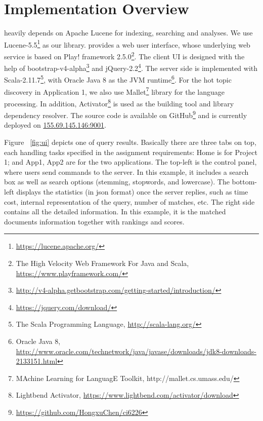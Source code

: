 \section{Implementation Overview}\label{sec:impl-overview}

{\SS} heavily depends on Apache Lucene for indexing, searching and analyses. We use Lucene-5.5\footnote{\url{https://lucene.apache.org/}} as our library. {\SS} provides a web user interface, whose underlying web service is based on Play! framework 2.5.0\footnote{The High Velocity Web Framework For Java and Scala, \url{https://www.playframework.com/}}. The client UI is designed with the help of bootstrap-v4-alpha\footnote{\url{http://v4-alpha.getbootstrap.com/getting-started/introduction/}} and jQuery-2.2\footnote{\url{https://jquery.com/download/}}. The server side is implemented with Scala-2.11.7\footnote{The Scala Programming Language, \url{http://scala-lang.org/}}, with Oracle Java 8 as the JVM runtime\footnote{Oracle Java 8, \url{http://www.oracle.com/technetwork/java/javase/downloads/jdk8-downloads-2133151.html}}.
For the hot topic discovery in Application 1, we also use Mallet\footnote{MAchine Learning for LanguagE Toolkit, http://mallet.cs.umass.edu/} library for the language processing. In addition, \textsf{Activator}\footnote{Lightbend Activator, \url{https://www.lightbend.com/activator/download}} is used as the building tool and library dependency resolver. The source code is available on GitHub\footnote{\url{https://github.com/HongxuChen/ci6226}} and {\SS} is currently deployed on \url{155.69.145.146:9001}.

Figure ~\ref{fig:ui} depicts one of {\SS} query results. Basically there are three tabs on top, each handling tasks specified in the assignment requirements: \textsf{Home} is for Project 1; and \textsf{App1}, \textsf{App2} are for the two applications. The top-left is the control panel, where users send commands to the server. In this example, it includes a search box as well as search options (stemming, stopwords, and lowercase). The bottom-left displays the statistics (in json format) once the server replies, such as time cost, internal representation of the query, number of matches, etc. The right side contains all the detailed information. In this example, it is the matched documents information together with rankings and scores.

